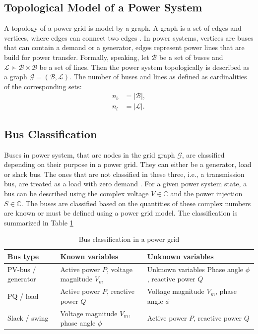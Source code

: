 \subsection{Topological Model of a Power System}
A topology of a power grid is model by a graph. A graph is a set of edges and vertices, where edges can connect two edges \cite{zhuravlev1999discrete}. In power systems, vertices are buses that can contain a demand or a generator, edges represent power lines that are build for power transfer. Formally, speaking, let $\mathcal{B}$ be a set of buses and $\mathcal{L} \succ \mathcal{B} \times \mathcal{B}$ be a set of lines. Then the power system topologically is described as a graph $\mathcal{G} = (\mathcal{B}, \mathcal{L})$. The number of buses and lines as defined as cardinalities of the corresponding sets:
$$
\begin{aligned}
n_b &= |\mathcal{B}|, \\
n_l &= |\mathcal{L}|.
\end{aligned}
$$

\subsection{Bus Classification}

Buses in power system, that are nodes in the grid graph $\mathcal{G}$, are classified depending on their purpose in a power grid. They can either be a generator, load or slack bus. The ones that are not classified in these three, i.e., a transmission bus, are treated as a load with zero demand \cite{machowski2020power}. 
For a given power system state, a bus can be described using the complex voltage $V \in \mathbb{C}$ and the power injection $S \in \mathbb{C}$. The buses are classified based on the quantities of these complex numbers are known or must be defined using a power grid model. The classification is summarized in Table \ref{tab:bus_classif}
\begin{table}
\caption{Bus classification in a power grid}
\label{tab:bus_classif}
    \centering
        \begin{tabularx}{\textwidth}{|X|X|X|}
        \toprule
        Bus type & Known variables & Unknown variables  \\
        \midrule
        PV-bus / generator & Active power $P$, voltage magnitude $V_m$ & Unknown variables  Phase angle $\phi$, reactive power $Q$ \\
        
        PQ / load & Active power $P$, reactive power $Q$ & Voltage magnitude $V_m$, phase angle $\phi$  \\

        Slack / swing & Voltage magnitude $V_m$, phase angle $\phi$  & Active power $P$, reactive power $Q$  \\
        
        \bottomrule
    \end{tabularx}
\end{table}

